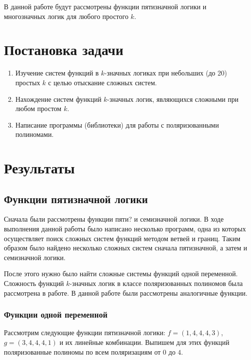 \documentclass[bibliography=totoc, a4paper, 12pt]{extarticle}
\let\stdsection\section
\renewcommand\section{\newpage\stdsection}
\begin{document}
В данной работе будут рассмотрены функции пятизначной логики и многозначных
логик для любого простого $k$.


\section{Постановка задачи}
\begin{enumerate}
\item Изучение систем функций в $k$-значных логиках при небольших (до 20)
простых $k$ с целью отыскание сложных систем.

\item Нахождение систем функций $k$-значных логик, являющихся сложными при любом
простом $k$.

\item Написание программы (библиотеки) для работы с поляризованными полиномами.
\end{enumerate}

\section{Результаты}

\subsection{Функции пятизначной логики}

Сначала были рассмотрены функции пяти? и семизначной логики. В ходе выполнения
данной работы было написано несколько программ, одна из которых осуществляет
поиск сложных систем функций методом ветвей и границ. Таким образом было найдено
несколько сложных систем сначала пятизначной, а затем и семизначной логики.

После этого нужно было найти сложные системы функций одной переменной. Сложность
функций $k$-значных логик в классе поляризованных полиномов была рассмотрена в
работе\cite{ss04}. В данной работе были рассмотрены аналогичные функции.

\subsubsection{Функции одной переменной} Рассмотрим следующие функции
пятизначной логики: $f = (1,4,4,4,3)$, $g = (3,4,4,4,1)$ и их линейные
комбинации. Выпишем для этих функций поляризованные полиномы по всем
поляризациям от $0$ до $4$.
\end{document}
